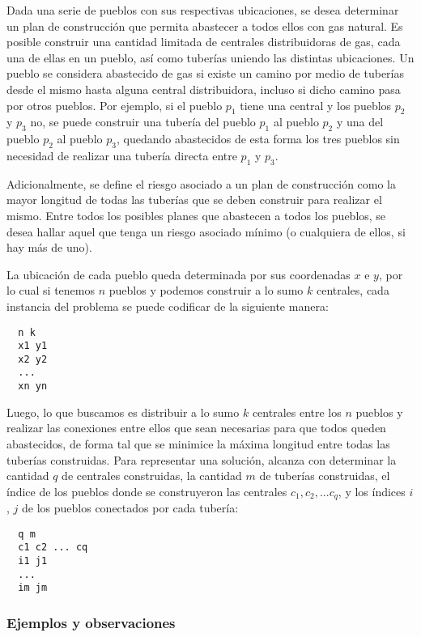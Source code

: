 Dada una serie de pueblos con sus respectivas ubicaciones, se desea determinar un plan de construcción que permita abastecer a todos ellos con gas natural. Es posible construir una cantidad limitada de centrales distribuidoras de gas, cada una de ellas en un pueblo, así como tuberías uniendo las distintas ubicaciones. Un pueblo se considera abastecido de gas si existe un camino por medio de tuberías desde el mismo hasta alguna central distribuidora, incluso si dicho camino pasa por otros pueblos. Por ejemplo, si el pueblo $p_1$ tiene una central y los pueblos $p_2$ y $p_3$ no, se puede construir una tubería del pueblo $p_1$ al pueblo $p_2$ y una del pueblo $p_2$ al pueblo $p_3$, quedando abastecidos de esta forma los tres pueblos sin necesidad de realizar una tubería directa entre $p_1$ y $p_3$.

Adicionalmente, se define el riesgo asociado a un plan de construcción como la mayor longitud de todas las tuberías que se deben construir para realizar el mismo. Entre todos los posibles planes que abastecen a todos los pueblos, se desea hallar aquel que tenga un riesgo asociado mínimo (o cualquiera de ellos, si hay más de uno).

La ubicación de cada pueblo queda determinada por sus coordenadas $x$ e $y$, por lo cual si tenemos $n$ pueblos y podemos construir a lo sumo $k$ centrales, cada instancia del problema se puede codificar de la siguiente manera:

\begin{verbatim}
  n k
  x1 y1
  x2 y2
  ...
  xn yn
\end{verbatim}

Luego, lo que buscamos es distribuir a lo sumo $k$ centrales entre los $n$ pueblos y realizar las conexiones entre ellos que sean necesarias para que todos queden abastecidos, de forma tal que se minimice la máxima longitud entre todas las tuberías construidas. Para representar una solución, alcanza con determinar la cantidad $q$ de centrales construidas, la cantidad $m$ de tuberías construidas, el índice de los pueblos donde se construyeron las centrales $c_1, c_2, ... c_q$, y los índices $i$, $j$ de los pueblos conectados por cada tubería:

\begin{verbatim}
  q m
  c1 c2 ... cq
  i1 j1
  ...
  im jm
\end{verbatim}

\subsubsection{Ejemplos y observaciones}

